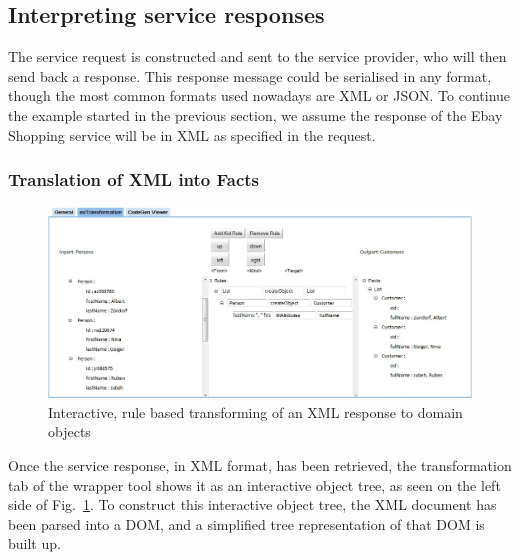 

\subsection{Interpreting service responses} %
\label{sub:interpreting_service_responses}

The service request is constructed and sent to the service provider, who will then send back a response. This response message could be serialised in any format, though the most common formats used nowadays are XML or JSON. To continue the example started in the previous section, we assume the response of the Ebay Shopping service will be in XML as specified in the request.

\subsubsection{Translation of XML into Facts} %
\label{ssub:translation_xml_into_facts}

\begin{figure}
  \begin{center}
    \includegraphics[width=\linewidth]{images/ServiceWrapperToolGVSWithTransformationRules.png}
    \caption{Interactive, rule based transforming of an XML response to domain objects}
    \label{fig:response_service_execution}
  \end{center}
\end{figure}

Once the service response, in XML format, has been retrieved, the transformation tab of the wrapper tool shows it as an interactive object tree, as seen on the left side of Fig.~\ref{fig:response_service_execution}. To construct this interactive object tree, the XML document has been parsed into a DOM, and a simplified tree representation of that DOM is built up. 

